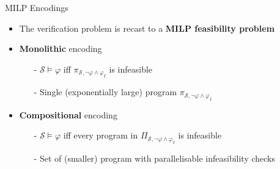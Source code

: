 \documentclass[10pt]{beamer}
\newcommand\blfootnote[1]{%
  \begingroup
  \renewcommand\thefootnote{}\footnote{#1}%
  \addtocounter{footnote}{-1}%
  \endgroup
}
\begin{document}
\begin{frame}{MILP Encodings}

\begin{itemize} \itemsep 1em
        \item The verification problem is recast to a {\bf MILP feasibility problem}

    \item {\bf Monolithic} encoding
        \begin{itemize}
            \item[\textcolor{black}{-}] $\mathcal S \models \varphi$ iff
                $\pi_{\mathcal S, \neg \varphi \land \varphi_I}$ is infeasible
            \item[\textcolor{black}{-}] Single (exponentially large) program
                $\pi_{\mathcal S, \neg \varphi \land \varphi_I}$

            \begin{figure}
            \end{figure}
        \end{itemize}

    \item {\bf Compositional} encoding
        \begin{itemize}
            \item[\textcolor{black}{-}] $\mathcal S \models \varphi$ iff
                every program in $\Pi_{\mathcal S, \neg \varphi \land \varphi_I}$ is infeasible
            \item[\textcolor{black}{-}] Set of (smaller) program with parallelisable infeasibility checks

            \begin{figure}
            \end{figure}
        \end{itemize}

\end{itemize} 


\end{frame}
\end{document}
